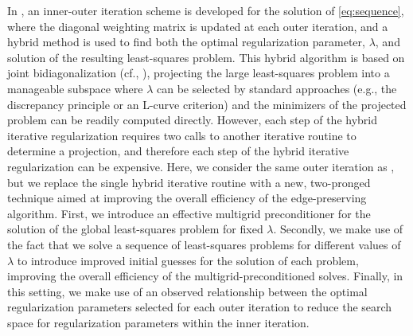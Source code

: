  In \cite{Gazzola_etal_2020}, an inner-outer iteration scheme is
 developed for the solution of \eqref{eq:sequence}, where the diagonal
 weighting matrix is updated at each outer iteration, and a hybrid
 method is used to find both the optimal regularization parameter,
 $\lambda$, and solution of the resulting least-squares problem.  This
 hybrid algorithm is based on joint bidiagonalization (cf.,
 \cite{Kilmer_Hanson_Espanol_2007}), projecting the large
 least-squares problem into a manageable subspace where $\lambda$ can
 be selected by standard approaches (e.g., the discrepancy principle
 or an L-curve criterion) and the minimizers of the projected problem
 can be readily computed directly.  However, each step of the hybrid
 iterative regularization requires two calls to another iterative
 routine to determine a projection, and therefore each step of the
 hybrid iterative regularization can be expensive.  Here, we consider
 the same outer iteration as \cite{Gazzola_etal_2020}, but we replace
 the single hybrid iterative routine with a new, two-pronged technique
 aimed at improving the overall efficiency of the edge-preserving
 algorithm.  First, we introduce an effective multigrid preconditioner
 for the solution of the global least-squares problem for fixed
 $\lambda$.  Secondly, we make use of the fact that we solve a
 sequence of least-squares problems for different values of $\lambda$
 to introduce improved initial guesses for the solution of each
 problem, improving the overall efficiency of the
 multigrid-preconditioned solves.  Finally, in this setting, we make
 use of an observed relationship between the optimal regularization
 parameters selected for each outer iteration to reduce the search
 space for regularization parameters within the inner iteration.
